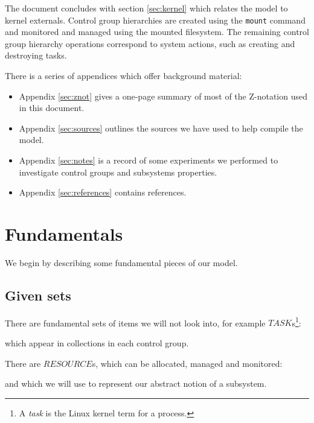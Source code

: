 \documentclass[a4paper,twoside,12pt]{article}
\begin{document}
The document concludes with section \ref{sec:kernel} which relates the model to kernel externals. 
Control group hierarchies are created using the \texttt{mount} command and monitored and managed using the mounted filesystem. 
The remaining control group hierarchy operations correspond to system actions, such as creating and destroying tasks.

There is a series of appendices which offer background material:
\begin{itemize}
\item Appendix \ref{sec:znot} gives a one-page summary of most of the Z-notation used in this document.

\item Appendix \ref{sec:sources} outlines the sources we have used to help compile the model.

\item Appendix \ref{sec:notes} is a record of some experiments we performed to investigate control groups and subsystems properties.

\item Appendix \ref{sec:references} contains references.

\end{itemize}

\section{Fundamentals}
\label{sec:fundamentals}

We begin by describing some fundamental pieces of our model.

\subsection{Given sets}
There are fundamental sets of items we will not look into, 
for example $TASK$s\footnote{A \emph{task} is the Linux kernel term for a process.}:
\begin{zed}
[TASK]
\end{zed}
which appear in collections in each control group.

There are $RESOURCE$s, which can be allocated, managed and monitored:
\begin{zed}
[RESOURCE]
\end{zed}
and which we will use to represent our abstract notion of a subsystem.
\end{document}
